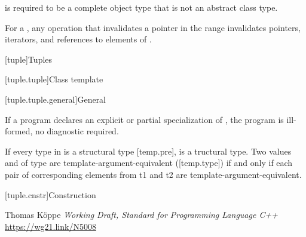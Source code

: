 \documentclass{wg21}
\begin{document}
\pnum
{} is required to be
a complete object type that is not an abstract class type.

\pnum
For a  ,
any operation that invalidates a pointer in
the range 
invalidates pointers, iterators, and references to elements of .

\ednote{[...]}


[tuple]{Tuples}

[tuple.tuple]{Class template }


[tuple.tuple.general]{General}

If a program declares an explicit or partial specialization of ,
the program is ill-formed, no diagnostic required.

\begin{addedblock}
If every type in  is a structural type [temp.pre],  is a tructural type.
Two values  and  of type  are template-argument-equivalent ([temp.type]) if and only if each pair of corresponding elements from t1 and t2 are template-argument-equivalent.
\end{addedblock}

[tuple.cnstr]{Construction}
%
%
%
%
%
%
%
%





\renewcommand{\section}[2]{}%

\begin{thebibliography}{9}

Thomas Köppe
\emph{Working Draft, Standard for Programming Language C++}\newline
\url{https://wg21.link/N5008}


\end{thebibliography}
\end{document}
